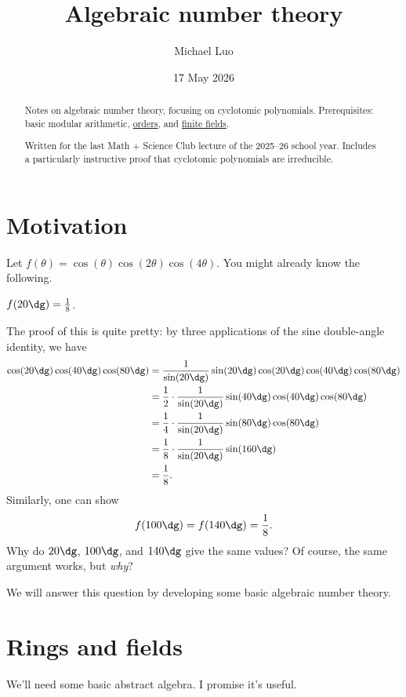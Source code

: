 \documentclass[11pt]{scrartcl}
\author{Michael Luo}
\title{Algebraic number theory}
\date{17 May 2026}
\begin{document}
\maketitle

\begin{abstract}
	Notes on algebraic number theory, focusing on cyclotomic polynomials. Prerequisites: basic modular arithmetic, \href{https://knowingant.github.io/handouts/orders/orders.pdf}{orders}, and \href{https://knowingant.github.io/handouts/finite-fields/finite-fields.pdf}{finite fields}.

	Written for the last Math + Science Club lecture of the 2025--26 school year.
	Includes a particularly instructive proof that cyclotomic polynomials are irreducible.
\end{abstract}

\section{Motivation}
\label{sec:motivation}

Let $f(\theta) = \cos(\theta)\cos(2\theta)\cos(4\theta)$.
You might already know the following.
\begin{fact}
	$f(20\dg) = \frac18$.
\end{fact}
The proof of this is quite pretty: 
by three applications of the sine double-angle identity, we have
\begin{align*}
	\cos(20\dg)\cos(40\dg)\cos(80\dg) &=
	\frac1{\sin(20\dg)}\sin(20\dg)\cos(20\dg)\cos(40\dg)\cos(80\dg) \\
	&= \frac12 \cdot \frac1{\sin(20\dg)}\sin(40\dg)\cos(40\dg)\cos(80\dg) \\
	&= \frac14 \cdot \frac1{\sin(20\dg)}\sin(80\dg)\cos(80\dg) \\
	&= \frac18 \cdot \frac1{\sin(20\dg)}\sin(160\dg) \\
	&= \frac18.
\end{align*}
Similarly, one can show
\[f(100\dg) = f(140\dg) = \frac18.\]
Why do $20\dg$, $100\dg$, and $140\dg$ give the same values?
Of course, the same argument works, but \emph{why}?

We will answer this question by developing some basic algebraic number theory.

\section{Rings and fields}

We'll need some basic abstract algebra. I promise it's useful.
\end{document}
